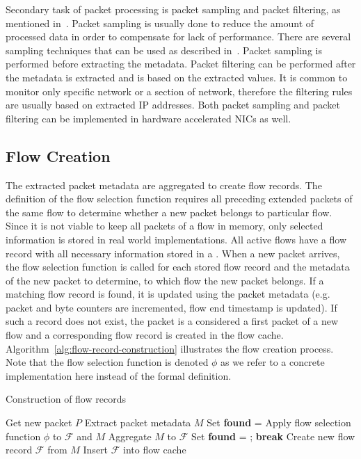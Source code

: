 Secondary task of packet processing is packet sampling and packet filtering, as mentioned in~\cite{rfc5470}. Packet sampling is usually done to reduce the amount of processed data in order to compensate for lack of performance. There are several sampling techniques that can be used as described in~\cite{rfc5476}. Packet sampling is performed before extracting the metadata. Packet filtering can be performed after the metadata is extracted and is based on the extracted values. It is common to monitor only specific network or a section of network, therefore the filtering rules are usually based on extracted IP addresses. Both packet sampling and packet filtering can be implemented in hardware accelerated NICs as well.

\subsection{Flow Creation}\label{subsec:flow-creation}

The extracted packet metadata are aggregated to create flow records. The definition of the flow selection function requires all preceding extended packets of the same flow to determine whether a new packet belongs to particular flow. Since it is not viable to keep all packets of a flow in memory, only selected information is stored in real world implementations. All active flows have a flow record with all necessary information stored in a \emph{}. When a new packet arrives, the flow selection function is called for each stored flow record and the metadata of the new packet to determine, to which flow the new packet belongs. If a matching flow record is found, it is updated using the packet metadata (e.g. packet and byte counters are incremented, flow end timestamp is updated). If such a record does not exist, the packet is a considered a first packet of a new flow and a corresponding flow record is created in the flow cache. Algorithm~\ref{alg:flow-record-construction} illustrates the flow creation process. Note that the flow selection function is denoted $\phi$ as we refer to a concrete implementation here instead of the formal definition.

\begin{algorithm}
	\caption{Construction of flow records}
	\label{alg:flow-record-construction}
	\begin{algorithmic}[1]
		\LOOP 
			\STATE Get new packet $P$
			\STATE Extract packet metadata $M$
			\STATE Set \textbf{found} = \FALSE
				\STATE Apply flow selection function $\phi$ to $\mathcal{F}$ and $M$
					\STATE Aggregate $M$ to $\mathcal{F}$
					\STATE Set \textbf{found} = \TRUE;
					\STATE \textbf{break}
				\ENDIF
			\ENDFOR
				\STATE Create new flow record $\mathcal{F}$ from $M$
				\STATE Insert $\mathcal{F}$ into flow cache
			\ENDIF
		\ENDLOOP
    \end{algorithmic}
\end{algorithm}

